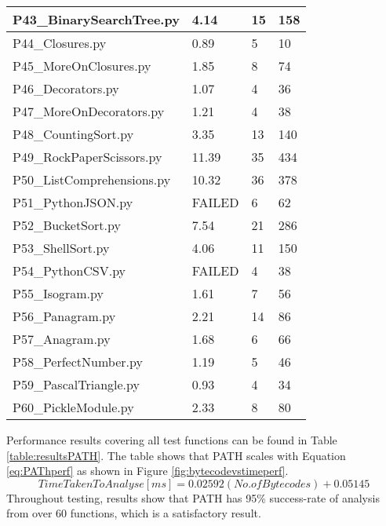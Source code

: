 \begin{longtable}{|p{5cm}|p{3.5cm}|p{1cm}|p{3cm}|}
        \hline
        P43\_BinarySearchTree.py&4.14 & 15&158\\
        \hline
        P44\_Closures.py& 0.89 & 5 & 10\\
        \hline
        P45\_MoreOnClosures.py&1.85 & 8 & 74\\
        \hline
        P46\_Decorators.py&1.07& 4 & 36\\
        \hline
        P47\_MoreOnDecorators.py&1.21&4&38\\
        \hline
        P48\_CountingSort.py&3.35&13&140\\
        \hline
        P49\_RockPaperScissors.py&11.39&35&434\\
        \hline
        P50\_ListComprehensions.py&10.32&36&378\\
        \hline
        P51\_PythonJSON.py&FAILED&6&62\\
        \hline
        P52\_BucketSort.py&7.54& 21&286\\
        \hline
        P53\_ShellSort.py&4.06& 11&150\\
        \hline
        P54\_PythonCSV.py&FAILED& 4 & 38\\
        \hline
        P55\_Isogram.py&1.61& 7&56\\
        \hline
        P56\_Panagram.py&2.21& 14&86\\
        \hline
        P57\_Anagram.py&1.68& 6 &66\\
        \hline
        P58\_PerfectNumber.py&1.19&5&46\\
        \hline
        P59\_PascalTriangle.py&0.93&4&34\\
        \hline
        P60\_PickleModule.py&2.33&8&80\\
        \hline
    \end{longtable}
    \normalsize

    
    \par Performance results covering all test functions can be found in Table \ref{table:resultsPATH}. The table shows that \acs{PATH} scales with Equation \ref{eq:PAThperf} as shown in Figure \ref{fig:bytecodevstimeperf}.
    \begin{equation}
        \label{eq:PAThperf} 
        Time Taken To Analyse [ms] = 0.02592 (No. of Bytecodes) + 0.05145 
    \end{equation}
    Throughout testing, results show that \acs{PATH} has 95\% success-rate of analysis from over 60 functions, which is a satisfactory result.

